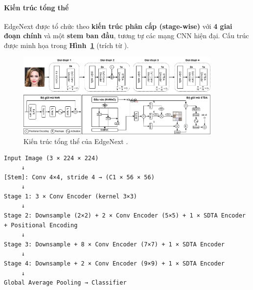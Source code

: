 \paragraph{Kiến trúc tổng thể}

EdgeNext được tổ chức theo \textbf{kiến trúc phân cấp (stage-wise)} với \textbf{4 giai đoạn chính} và một \textbf{stem ban đầu}, tương tự các mạng CNN hiện đại. Cấu trúc được minh họa trong \textbf{Hình~\ref{fig:edgenext_architecture}} (trích từ \cite{george2024edgeface}).

\begin{figure}[htbp]
    \centering
    \includegraphics[width=0.9\textwidth]{images/edgeNext.png}
    \caption{Kiến trúc tổng thể của EdgeNext .}
    \label{fig:edgenext_architecture}
\end{figure}

\begin{verbatim}
Input Image (3 × 224 × 224)
     ↓
[Stem]: Conv 4×4, stride 4 → (C1 × 56 × 56)
     ↓
Stage 1: 3 × Conv Encoder (kernel 3×3)
     ↓
Stage 2: Downsample (2×2) + 2 × Conv Encoder (5×5) + 1 × SDTA Encoder + Positional Encoding
     ↓
Stage 3: Downsample + 8 × Conv Encoder (7×7) + 1 × SDTA Encoder
     ↓
Stage 4: Downsample + 2 × Conv Encoder (9×9) + 1 × SDTA Encoder
     ↓
Global Average Pooling → Classifier
\end{verbatim}

